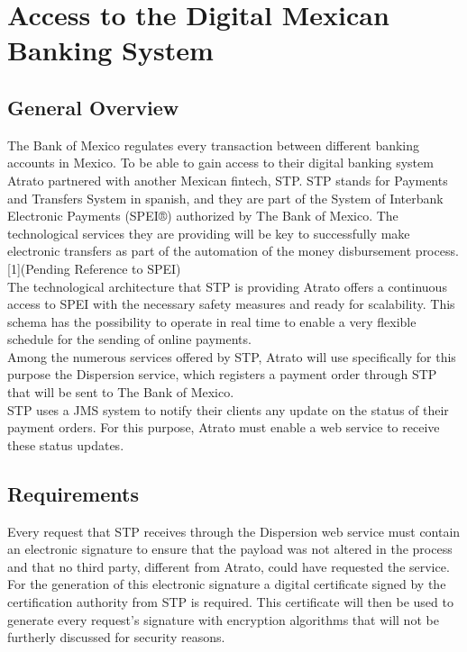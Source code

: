 \chapter{Access to the Digital Mexican Banking System}

\section{General Overview}

The Bank of Mexico regulates every transaction between different banking accounts in Mexico. To be able to gain access to their digital banking system Atrato partnered with another Mexican fintech, STP. STP stands for Payments and Transfers System in spanish, and they are part of the System of Interbank Electronic Payments (SPEI®) authorized by The Bank of Mexico. The technological services they are providing will be key to successfully make electronic transfers as part of the automation of the money disbursement process. [1](Pending Reference to SPEI)\\

The technological architecture that STP is providing Atrato offers a continuous access to SPEI with the necessary safety measures and ready for scalability. This schema has the possibility to operate in real time to enable a very flexible schedule for the sending of online payments.\\

Among the numerous services offered by STP, Atrato will use specifically for this purpose the Dispersion service, which registers a payment order through STP that will be sent to The Bank of Mexico.\\

STP uses a JMS system to notify their clients any update on the status of their payment orders. For this purpose, Atrato must enable a web service to receive these status updates.

\section{Requirements}

Every request that STP receives through the Dispersion web service must contain an electronic signature to ensure that the payload was not altered in the process and that no third party, different from Atrato, could have requested the service.\\

For the generation of this electronic signature a digital certificate signed by the certification authority from STP is required. This certificate will then be used to generate every request’s signature with encryption algorithms that will not be furtherly discussed for security reasons.\\

